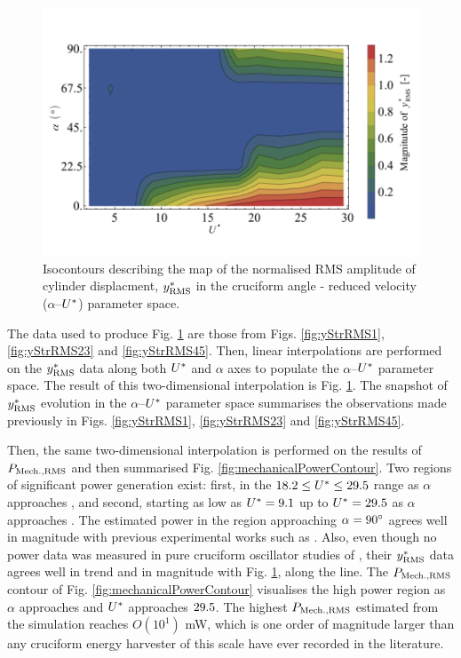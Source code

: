 \documentclass[oneside]{utmthesis}
\begin{document}
\begin{figure}[H]
  \centering
  \includegraphics[width=1\textwidth]{figs/yRMSContour}
  \caption{Isocontours describing the map of the normalised RMS amplitude of cylinder displacment, $y^{*}_{\text{RMS}}$ in the cruciform angle - reduced velocity ($\alpha$--$U^{*}$) parameter space.}
  \label{fig:yRMSContour}
\end{figure}

\noindent The data used to produce Fig. \ref{fig:yRMSContour} are those from Figs. \ref{fig:yStrRMS1}, \ref{fig:yStrRMS23} and \ref{fig:yStrRMS45}. Then, linear interpolations are performed on the $y^{*}_{\text{RMS}}$ data along both $U^{*}$ and $\alpha$ axes to populate the $\alpha$--$U^{*}$ parameter space. The result of this two-dimensional interpolation is Fig. \ref{fig:yRMSContour}. The snapshot of $y^{*}_{\text{RMS}}$ evolution in the $\alpha$--$U^{*}$ parameter space summarises the observations made previously in Figs. \ref{fig:yStrRMS1}, \ref{fig:yStrRMS23} and \ref{fig:yStrRMS45}.

Then, the same two-dimensional interpolation is performed on the results of $P_{\text{Mech.,RMS}}$ and then summarised Fig. \ref{fig:mechanicalPowerContour}. Two regions of significant power generation exist: first, in the $18.2 \leq U^{*} \leq 29.5$ range as $\alpha$ approaches \angfi{}, and second, starting as low as $U^{*} = 9.1$ up to $U^{*} = 29.5$ as $\alpha$ approaches \angon{}. The estimated power in the region approaching $\alpha = \angfi{}$ agrees well in magnitude with previous experimental works such as \citet{Koide2013}. Also, even though no power data was measured in pure cruciform oscillator studies of \citet{Koide2009,Nguyen2012}, their $y^{*}_{\text{RMS}}$ data agrees well in trend and in magnitude with Fig. \ref{fig:yRMSContour}, along the \angfi{} line. The $P_{\text{Mech.,RMS}}$ contour of Fig. \ref{fig:mechanicalPowerContour} visualises the high power region as $\alpha$ approaches \angon{} and $U^{*}$ approaches $29.5$. The highest $P_{\text{Mech.,RMS}}$ estimated from the simulation reaches $O(10^{1})$ \si{\milli\watt}, which is one order of magnitude larger than any cruciform energy harvester of this scale have ever recorded in the literature.
\end{document}
